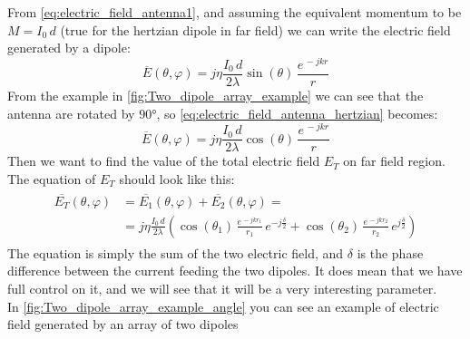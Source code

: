 From \cref{eq:electric_field_antenna1}, and assuming the equivalent momentum to be $M=I_0\,d$ (true for the hertzian dipole in far field) we can write the electric field generated by a dipole:
\begin{equation}\label{eq:electric_field_antenna_hertzian}
    \overline{E}(\theta,\varphi)=j\eta\frac{I_0\,d}{2\lambda}\sin(\theta)\,\frac{e^{\,-jkr}}{r}
\end{equation}
From the example in \cref{fig:Two_dipole_array_example} we can see that the antenna are rotated by $90\si{\degree}$, so \cref{eq:electric_field_antenna_hertzian} becomes:
\begin{equation}\label{eq:electric_field_antenna_hertzian_rotated}
    \overline{E}(\theta,\varphi)=j\eta\frac{I_0\,d}{2\lambda}\cos(\theta)\,\frac{e^{\,-jkr}}{r}
\end{equation}
Then we want to find the value of the total electric field $E_T$ on far field region. The equation of $E_T$ should look like this:
\begin{align}\label{eq:electric_field_dual_array1}
    \begin{split}
    \overline{E_T}(\theta,\varphi)&=\overline{E_1}(\theta,\varphi)+\overline{E_2}(\theta,\varphi)=\\[5pt]
    &=j\eta\frac{I_0\,d}{2\lambda}\left( \cos(\theta_1)\,\frac{e^{\,-jkr_1}}{r_1}\,e^{-j\frac{\delta}{2}}+ \cos(\theta_2)\,\frac{e^{\,-jkr_2}}{r_2}\,e^{j\frac{\delta}{2}} \right)
    \end{split}
\end{align}
The equation is simply the sum of the two electric field, and $\delta$ is the phase difference between the current feeding the two dipoles. It does mean that we have full control on it, and we will see that it will be a very interesting parameter.\\
In \cref{fig:Two_dipole_array_example_angle} you can see an example of electric field generated by an array of two dipoles

